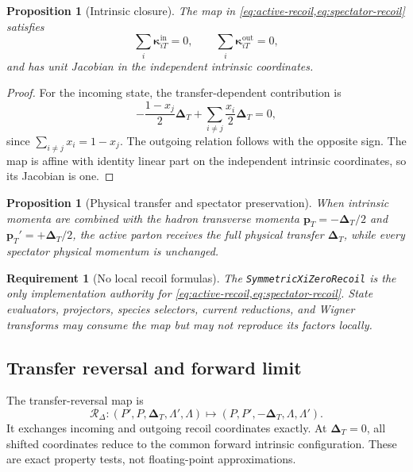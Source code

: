 \documentclass[11pt]{article}
\newtheorem{requirement}[definition]{Requirement}
\newtheorem{proposition}[definition]{Proposition}
\newcommand{\DT}{\bm{\Delta}_{T}}
\newcommand{\cR}{\mathcal R}
\newcommand{\RecoilMap}{\texttt{SymmetricXiZeroRecoil}}
\begin{document}
\begin{proposition}[Intrinsic closure]
The map in \cref{eq:active-recoil,eq:spectator-recoil} satisfies
\begin{equation}
 \sum_i\bm\kappa_{iT}^{\mathrm{in}}=0,
 \qquad
 \sum_i\bm\kappa_{iT}^{\mathrm{out}}=0,
\end{equation}
and has unit Jacobian in the independent intrinsic coordinates.
\end{proposition}

\begin{proof}
For the incoming state, the transfer-dependent contribution is
\begin{equation}
 -\frac{1-x_j}{2}\DT
 +\sum_{i\neq j}\frac{x_i}{2}\DT
 =0,
\end{equation}
since \(\sum_{i\neq j}x_i=1-x_j\).  The outgoing relation follows with the
opposite sign.  The map is affine with identity linear part on the independent
intrinsic coordinates, so its Jacobian is one.
\end{proof}

\begin{proposition}[Physical transfer and spectator preservation]
When intrinsic momenta are combined with the hadron transverse momenta
\(\bm p_T=-\DT/2\) and \(\bm p_T'=+\DT/2\), the active parton receives the
full physical transfer \(\DT\), while every spectator physical momentum is
unchanged.
\end{proposition}

\begin{requirement}[No local recoil formulas]
The \RecoilMap{} is the only implementation authority for
\cref{eq:active-recoil,eq:spectator-recoil}.  State evaluators, projectors,
species selectors, current reductions, and Wigner transforms may consume the
map but may not reproduce its factors locally.
\end{requirement}

\subsection{Transfer reversal and forward limit}

The transfer-reversal map is
\begin{equation}
 \cR_\Delta:
 (P',P,\DT,\Lambda',\Lambda)
 \longmapsto
 (P,P',-\DT,\Lambda,\Lambda').
\end{equation}
It exchanges incoming and outgoing recoil coordinates exactly.  At
\(\DT=0\), all shifted coordinates reduce to the common forward intrinsic
configuration.  These are exact property tests, not floating-point
approximations.
\end{document}
